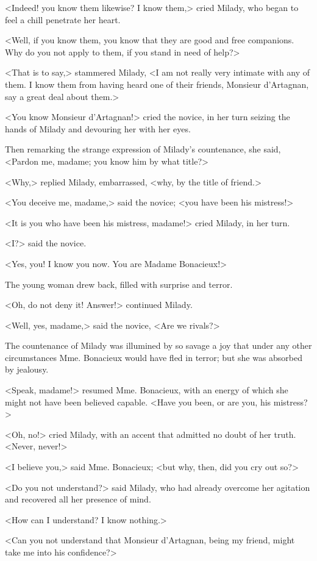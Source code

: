 <Indeed! you know them likewise? I know them,> cried Milady, who began to feel a chill penetrate her heart. 

<Well, if you know them, you know that they are good and free companions. Why do you not apply to them, if you stand in need of help?> 

<That is to say,> stammered Milady, <I am not really very intimate with any of them. I know them from having heard one of their friends, Monsieur d'Artagnan, say a great deal about them.> 

<You know Monsieur d'Artagnan!> cried the novice, in her turn seizing the hands of Milady and devouring her with her eyes. 

Then remarking the strange expression of Milady's countenance, she said, <Pardon me, madame; you know him by what title?> 

<Why,> replied Milady, embarrassed, <why, by the title of friend.> 

<You deceive me, madame,> said the novice; <you have been his mistress!> 

<It is you who have been his mistress, madame!> cried Milady, in her turn. 

<I?> said the novice. 

<Yes, you! I know you now. You are Madame Bonacieux!> 

The young woman drew back, filled with surprise and terror. 

<Oh, do not deny it! Answer!> continued Milady. 

<Well, yes, madame,> said the novice, <Are we rivals?> 

The countenance of Milady was illumined by so savage a joy that under any other circumstances Mme. Bonacieux would have fled in terror; but she was absorbed by jealousy. 

<Speak, madame!> resumed Mme. Bonacieux, with an energy of which she might not have been believed capable. <Have you been, or are you, his mistress?> 

<Oh, no!> cried Milady, with an accent that admitted no doubt of her truth. <Never, never!> 

<I believe you,> said Mme. Bonacieux; <but why, then, did you cry out so?> 

<Do you not understand?> said Milady, who had already overcome her agitation and recovered all her presence of mind. 

<How can I understand? I know nothing.> 

<Can you not understand that Monsieur d'Artagnan, being my friend, might take me into his confidence?> 

